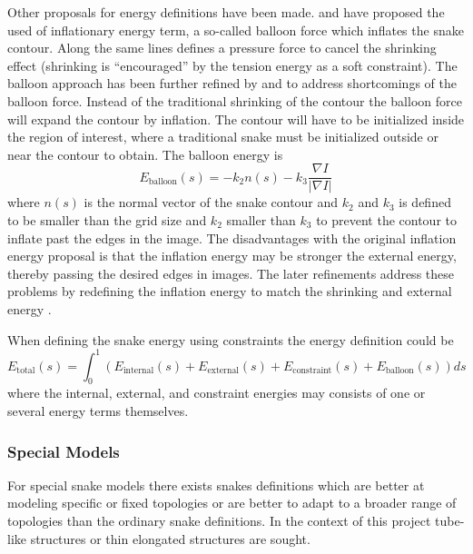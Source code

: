 Other proposals for energy definitions have been made. \citet{cohen91}
and \citet{cohen93} have proposed the used of inflationary energy
term, a so-called balloon force which inflates the snake contour.
Along the same lines \citet{xu93} defines a pressure force to cancel
the shrinking effect (shrinking is ``encouraged'' by the tension
energy as a soft constraint). The balloon approach has been further
refined by \citet{wang98} and \citet{li99} to address shortcomings of
the balloon force. Instead of the traditional shrinking of the contour
the balloon force will expand the contour by inflation.  The contour
will have to be initialized inside the region of interest, where a
traditional snake must be initialized outside or near the contour to
obtain. The balloon energy is
\begin{equation}
  \label{eq:energy-balloon}
  E_{\text{balloon}}(s) = -k_2 n(s) - k_3 \frac{\nabla I}{\lvert \nabla I \rvert}
\end{equation}
where $n(s)$ is the normal vector of the snake contour and $k_2$ and
$k_3$ is defined to be smaller than the grid size and $k_2$ smaller
than $k_3$ to prevent the contour to inflate past the edges in the image.
The disadvantages with the original inflation energy proposal is that
the inflation energy may be stronger the external energy, thereby
passing the desired edges in images. The later refinements address
these problems by redefining the inflation energy to match the
shrinking  and external energy  \citep{wang98} \citep{li99}.

When defining the snake energy using constraints the energy definition
could be
\begin{equation}
  \nonumber
  E_{\text{total}}(s) = \int^1_0(E_{\text{internal}}(s) + 
                                 E_{\text{external}}(s) +
                                 E_{\text{constraint}}(s) +
                                 E_{\text{balloon}}(s)) ds
\end{equation}
where the internal, external, and constraint energies may consists of
one or several energy terms themselves.

\subsubsection{Special Models}
\label{sec:special-models}


For special snake models there exists snakes definitions which are
better at modeling specific or fixed topologies or are better to adapt
to a broader range of topologies than the ordinary snake
definitions. In the context of this project tube-like structures or
thin elongated structures are sought.


